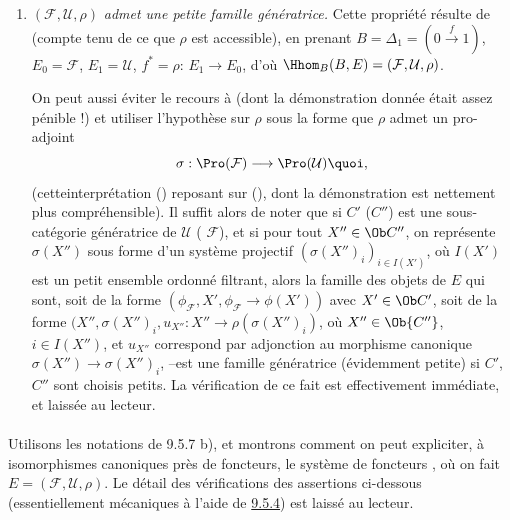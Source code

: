 \documentclass[10pt]{../fichiers-configuration-latex/smfart}
\begin{document}
\begin{enumerate}
\item $(\mathcal{F},\mathcal{U},\rho)$ \emph{admet une petite famille
génératrice.} Cette propriété résulte de  (compte tenu de
ce que $\rho$ est accessible), en prenant
$B=\Delta_1=(0\xrightarrow{f}1)$, $E_0=\mathcal{F}$,
$E_{1}=\mathcal{U}$, $f^{\ast}=\rho$: $E_1\rightarrow E_0$, d'où
$\Hhom_B(B,E)=(\mathcal{F},\mathcal{U},\rho)$.

On peut aussi éviter le recours à  (dont la démonstration
donnée était assez pénible !) et utiliser l'hypothèse sur $\rho$
sous la forme que $\rho$ admet un pro-adjoint
$$
\sigma:\Pro(\mathcal{F})\longrightarrow \Pro(\mathcal{U}){\quoi},
$$
(cette\pageoriginale interprétation () reposant sur
(), dont la démonstration est nettement plus
compréhensible). Il suffit alors de noter que si $C'$ (\resp $C''$)
est une sous-catégorie génératrice de $\mathcal{U}$ (\resp
$\mathcal{F}$), et si pour tout $X''\in \Ob C''$, on représente
$\sigma(X'')$ sous forme d'un système projectif
$(\sigma(X'')_i)_{i\in I(X')}$, où $I(X')$ est un petit ensemble
ordonné filtrant, alors la famille des objets de $E$ qui sont, soit
de la forme $(\phi_{\mathcal{F}}, X',\phi_{\mathcal{F}}\rightarrow
\phi(X'))$ avec $X'\in \Ob C'$, soit de la forme $(X'',\sigma
(X'')_i, u_{X''}:X''\rightarrow \rho(\sigma (X'')_i)$, où $X''\in \Ob
{C''}$, $i\in I (X'')$, et $u_{X''}$ correspond par adjonction au
morphisme canonique $\sigma(X'')\rightarrow \sigma (X'')_i$, --est
une famille génératrice (évidemment petite) si $C'$, $C''$ sont
choisis petits. La vérification de ce fait est effectivement
immédiate, et laissée au lecteur.
\end{enumerate}

\setcounter{subsubsection}{4} \setcounter{paragraph}{7}
\paragraph{}
Utilisons les notations de 9.5.7 b), et montrons comment on peut
expliciter, à isomorphismes canoniques près de foncteurs, le système
de foncteurs , où on fait
$E=(\mathcal{F},\mathcal{U},\rho)$. Le détail des vérifications des
assertions ci-dessous (essentiellement mécaniques à l'aide de
\hyperref[IV.theo9.5.4]{9.5.4}) est laissé au lecteur.

\setcounter{subsubsection}{8} \setcounter{paragraph}{0}
\end{document}
